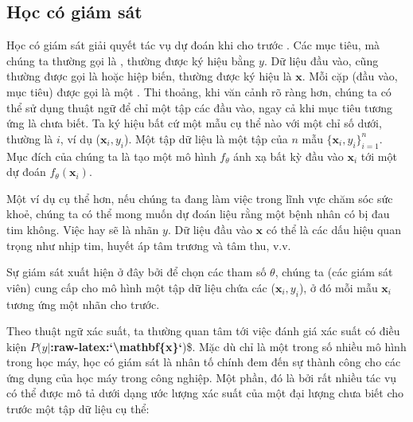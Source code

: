 \documentclass[letterpaper,11pt,english]{sphinxmanual}
\begin{document}
\subsection{Học có giám sát}
\label{\detokenize{chapter_introduction/index_vn:hoc-co-giam-sat}}


Học có giám sát giải quyết tác vụ dự đoán  khi cho trước . Các mục tiêu, mà chúng ta thường gọi là , thường được ký
hiệu bằng \(y\). Dữ liệu đầu vào, cũng thường được gọi là  hoặc hiệp biến, thường được ký hiệu là \(\mathbf{x}\). Mỗi
cặp (đầu vào, mục tiêu) được gọi là một . Thi thoảng, khi văn cảnh
rõ ràng hơn, chúng ta có thể sử dụng thuật ngữ  để chỉ một
tập các đầu vào, ngay cả khi mục tiêu tương ứng là chưa biết. Ta ký hiệu
bất cứ một mẫu cụ thể nào với một chỉ số dưới, thường là \(i\), ví
dụ (\(\mathbf{x}_i, y_i\)). Một tập dữ liệu là một tập của \(n\)
mẫu \(\{\mathbf{x}_i, y_i\}_{i=1}^n\). Mục đích của chúng ta là tạo
một mô hình \(f_\theta\) ánh xạ bất kỳ đầu vào \(\mathbf{x}_i\)
tới một dự đoán \(f_{\theta}(\mathbf{x}_i)\).



Một ví dụ cụ thể hơn, nếu chúng ta đang làm việc trong lĩnh vực chăm sóc
sức khoẻ, chúng ta có thể mong muốn dự đoán liệu rằng một bệnh nhân có
bị đau tim không. Việc  hay  sẽ là nhãn
\(y\). Dữ liệu đầu vào \(\mathbf{x}\) có thể là các dấu hiệu
quan trọng như nhịp tim, huyết áp tâm trương và tâm thu, v.v.



Sự giám sát xuất hiện ở đây bởi để chọn các tham số \(\theta\),
chúng ta (các giám sát viên) cung cấp cho mô hình một tập dữ liệu chứa
các  (\(\mathbf{x}_i, y_i\)), ở đó mỗi mẫu
\(\mathbf{x}_i\) tương ứng một nhãn cho trước.



Theo thuật ngữ xác suất, ta thường quan tâm tới việc đánh giá xác suất
có điều kiện \(P(y|\){\color{red}\bfseries{}:raw-latex:{}`\textbackslash{}mathbf\{x\}{}`})\$. Mặc dù chỉ là một
trong số nhiều mô hình trong học máy, học có giám sát là nhân tố chính
đem đến sự thành công cho các ứng dụng của học máy trong công nghiệp.
Một phần, đó là bởi rất nhiều tác vụ có thể được mô tả dưới dạng ước
lượng xác suất của một đại lượng chưa biết cho trước một tập dữ liệu cụ
thể:
\end{document}
